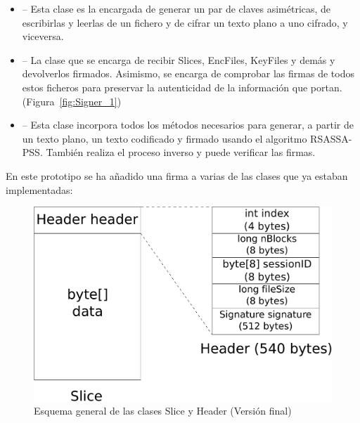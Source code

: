 \begin{itemize}
  \item {} -- Esta clase es la encargada de generar un par de
  claves asimétricas, de escribirlas y leerlas de un fichero y de cifrar
  un texto plano a uno cifrado, y viceversa.

  \item {} -- La clase que se encarga de recibir Slices, EncFiles,
  KeyFiles y demás y devolverlos firmados. Asimismo, se encarga de comprobar
  las firmas de todos estos ficheros para preservar la autenticidad de la
  información que portan. (Figura~\ref{fig:Signer_1})

  \item {} -- Esta clase incorpora todos los métodos necesarios
  para generar, a partir de un texto plano, un texto codificado y firmado
  usando el algoritmo RSASSA-PSS. También realiza el proceso inverso y puede
  verificar las firmas.
\end{itemize}



En este prototipo se ha añadido una firma a varias de las clases que ya estaban
implementadas:

\begin{figure}[ht]
  \centering
  \includegraphics[scale=0.4]{Figures/Slice_Header_2}
  \decoRule
  \caption[Slice - Header (Versión final)]{Esquema general de las clases Slice y Header (Versión final)}
  \label{fig:Slice_Header_2}
\end{figure}

